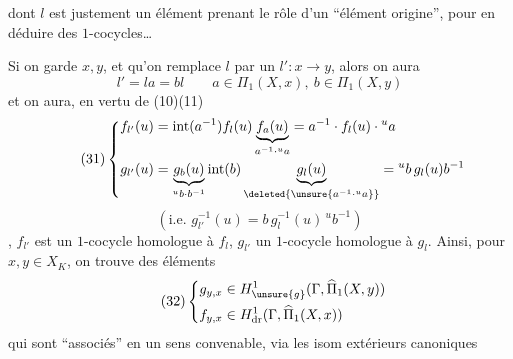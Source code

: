 dont $l$ est justement un élément prenant le rôle d'un ``élément origine'', pour en déduire des $1$-cocycles\ldots


Si on garde $x,y$, et qu'on remplace $l$ par un $l':x\longrightarrow y$, alors  on aura
\[
l'=la=bl\qquad a\in\Pi_1(X,x),\ b\in\Pi_1(X,y)
\]
et on aura, en vertu de (10)(11)
\[
\tag{31}\left\{\begin{aligned}
f_{l'}(u)&=\operatorname{int}(a^{-1})f_l(u)\underbrace{f_a(u)}_{a^{-1}\cdot{}^ua}=a^{-1}\cdot f_l(u)\cdot{}^ua\\
g_{l'}(u)&=\underbrace{g_b(u)}_{{}^ub\cdot b^{-1}}\operatorname{int}(b)\underbrace{g_l(u)}_{\deleted{\unsure{a^{-1}\cdot{}^ua}}}={}^ub\,g_l(u)b^{-1}
\end{aligned}\right.
\]
\[
(\text{i.e. }g_{l'}^{-1}(u)=b\,g_l^{-1}(u)\,{}^ub^{-1})
\]
, $f_{l'}$ est un $1$-cocycle  homologue à $f_l$, $g_{l'}$ un $1$-cocycle  homologue à $g_l$. Ainsi, pour $x,y\in X_K$, on trouve des éléments
\[
\tag{32}\left\{\begin{aligned}
g_{y,x}&\in H^1_{\unsure{g}}(\Gamma,\widehat\Pi_1(X,y))\\
f_{y,x}&\in H^1_{\mathrm{dr}}(\Gamma,\widehat\Pi_1(X,x))
\end{aligned}\right.
\]
 qui sont ``associés'' en un sens convenable, via les isom extérieurs canoniques

